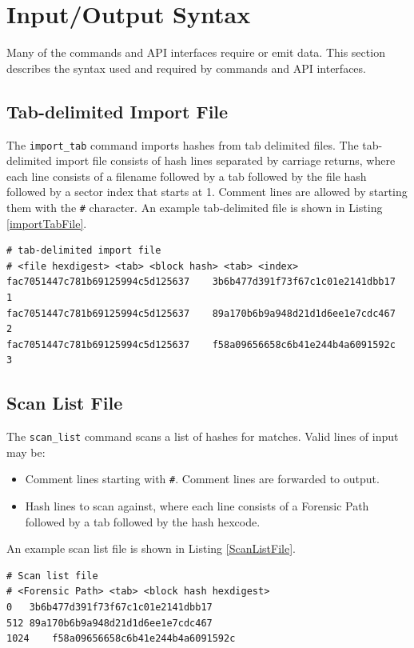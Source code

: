 \documentclass[11pt,fleqn]{article} %
\begin{document}
\section{\hdb Input/Output Syntax}
\label{InputOutputSyntax}
Many of the \hdb commands and API interfaces require or emit data.
This section describes the syntax used and required by \hdb
commands and API interfaces.

\subsection{Tab-delimited Import File}
The \verb+import_tab+ command imports hashes from tab delimited files.
The tab-delimited import file consists of hash lines separated by carriage returns, where each line consists of a filename followed by a tab followed by the file hash followed by a sector index that starts at 1.  Comment lines are allowed by starting them with the \texttt{\#} character.
An example tab-delimited file is shown in Listing \ref{importTabFile}.\\

\lstset{style=customfile}
\begin{lstlisting}[caption={Example tab-delimited import file}, label=importTabFile]
# tab-delimited import file
# <file hexdigest> <tab> <block hash> <tab> <index>
fac7051447c781b69125994c5d125637    3b6b477d391f73f67c1c01e2141dbb17    1
fac7051447c781b69125994c5d125637    89a170b6b9a948d21d1d6ee1e7cdc467    2
fac7051447c781b69125994c5d125637    f58a09656658c6b41e244b4a6091592c    3
\end{lstlisting}

\subsection{Scan List File}
The \verb+scan_list+ command scans a list of hashes for matches.  Valid lines of input may be:
\begin{itemize}
\item Comment lines starting with \verb+#+.  Comment lines are forwarded to output.
\item Hash lines to scan against, where each line consists of a Forensic Path followed by a tab followed by the hash hexcode.
\end{itemize}
An example scan list file is shown in Listing \ref{ScanListFile}.\\

\lstset{style=customfile}
\begin{lstlisting}[caption={Example scan list file}, label=ScanListFile]
# Scan list file
# <Forensic Path> <tab> <block hash hexdigest>
0	3b6b477d391f73f67c1c01e2141dbb17
512	89a170b6b9a948d21d1d6ee1e7cdc467
1024	f58a09656658c6b41e244b4a6091592c
\end{lstlisting}
\end{document}
